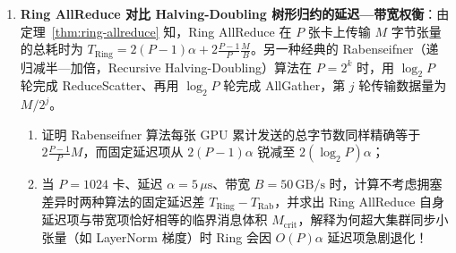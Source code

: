 
\begin{enumerate}
  \item[\textbf{6.6.3}] \textbf{Ring AllReduce 对比 Halving-Doubling 树形归约的延迟—带宽权衡}：由定理~\ref{thm:ring-allreduce} 知，Ring AllReduce 在 $P$ 张卡上传输 $M$ 字节张量的总耗时为 $T_{\mathrm{Ring}} = 2(P-1)\alpha + 2\frac{P-1}{P}\frac{M}{B}$。另一种经典的 Rabenseifner（递归减半—加倍，Recursive Halving-Doubling）算法在 $P = 2^k$ 时，用 $\log_2 P$ 轮完成 ReduceScatter、再用 $\log_2 P$ 轮完成 AllGather，第 $j$ 轮传输数据量为 $M / 2^j$。
  \begin{enumerate}
    \item 证明 Rabenseifner 算法每张 GPU 累计发送的总字节数同样精确等于 $2\frac{P-1}{P}M$，而固定延迟项从 $2(P-1)\alpha$ 锐减至 $2(\log_2 P)\alpha$；
    \item 当 $P = 1024$ 卡、延迟 $\alpha = 5\,\mu\mathrm{s}$、带宽 $B = 50\,\mathrm{GB/s}$ 时，计算不考虑拥塞差异时两种算法的固定延迟差 $T_{\mathrm{Ring}} - T_{\mathrm{Rab}}$，并求出 Ring AllReduce 自身延迟项与带宽项恰好相等的临界消息体积 $M_{\mathrm{crit}}$，解释为何超大集群同步小张量（如 LayerNorm 梯度）时 Ring 会因 $O(P)\alpha$ 延迟项急剧退化！
  \end{enumerate}


\end{enumerate}

